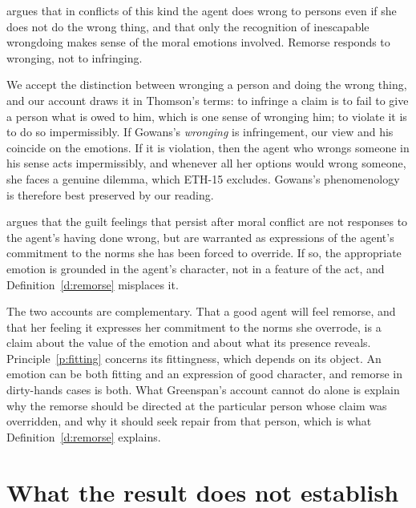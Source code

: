 \documentclass{situationist-preprint}
\begin{document}
\begin{objection}
\citet{Gowans1994} argues that in conflicts of this kind the agent does wrong to persons even if she does not do the wrong thing, and that only the recognition of inescapable wrongdoing makes sense of the moral emotions involved. Remorse responds to wronging, not to infringing.
\end{objection}

\begin{reply}
We accept the distinction between wronging a person and doing the wrong thing, and our account draws it in Thomson's terms: to infringe a claim is to fail to give a person what is owed to him, which is one sense of wronging him; to violate it is to do so impermissibly. If Gowans's \emph{wronging} is infringement, our view and his coincide on the emotions. If it is violation, then the agent who wrongs someone in his sense acts impermissibly, and whenever all her options would wrong someone, she faces a genuine dilemma, which ETH-15 excludes. Gowans's phenomenology is therefore best preserved by our reading.
\end{reply}

\begin{objection}
\citet{Greenspan1995} argues that the guilt feelings that persist after moral conflict are not responses to the agent's having done wrong, but are warranted as expressions of the agent's commitment to the norms she has been forced to override. If so, the appropriate emotion is grounded in the agent's character, not in a feature of the act, and Definition~\ref{d:remorse} misplaces it.
\end{objection}

\begin{reply}
The two accounts are complementary. That a good agent will feel remorse, and that her feeling it expresses her commitment to the norms she overrode, is a claim about the value of the emotion and about what its presence reveals. Principle~\ref{p:fitting} concerns its fittingness, which depends on its object. An emotion can be both fitting and an expression of good character, and remorse in dirty-hands cases is both. What Greenspan's account cannot do alone is explain why the remorse should be directed at the particular person whose claim was overridden, and why it should seek repair from that person, which is what Definition~\ref{d:remorse} explains.
\end{reply}

\section{What the result does not establish}
\end{document}
